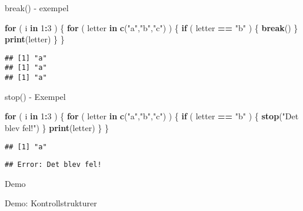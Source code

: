 \documentclass[
  11pt,
  ignorenonframetext,
]{beamer}
\newenvironment{Shaded}{\begin{snugshade}}{\end{snugshade}}
\newcommand{\ControlFlowTok}[1]{\textcolor[rgb]{0.13,0.29,0.53}{\textbf{#1}}}
\newcommand{\DecValTok}[1]{\textcolor[rgb]{0.00,0.00,0.81}{#1}}
\newcommand{\FunctionTok}[1]{\textcolor[rgb]{0.13,0.29,0.53}{\textbf{#1}}}
\newcommand{\NormalTok}[1]{#1}
\newcommand{\SpecialCharTok}[1]{\textcolor[rgb]{0.81,0.36,0.00}{\textbf{#1}}}
\newcommand{\StringTok}[1]{\textcolor[rgb]{0.31,0.60,0.02}{#1}}
\begin{document}
\begin{frame}[fragile]{break() - exempel}
\label{break---exempel}
\begin{Shaded}
\begin{Highlighting}[]
\ControlFlowTok{for}\NormalTok{ ( i }\ControlFlowTok{in} \DecValTok{1}\SpecialCharTok{:}\DecValTok{3}\NormalTok{ ) \{}
  \ControlFlowTok{for}\NormalTok{ ( letter }\ControlFlowTok{in} \FunctionTok{c}\NormalTok{(}\StringTok{"a"}\NormalTok{,}\StringTok{"b"}\NormalTok{,}\StringTok{"c"}\NormalTok{) ) \{}
    \ControlFlowTok{if}\NormalTok{ ( letter }\SpecialCharTok{==} \StringTok{"b"}\NormalTok{ ) \{ }\ControlFlowTok{break}\NormalTok{() \}}
    \FunctionTok{print}\NormalTok{(letter)}
\NormalTok{  \}}
\NormalTok{\}}
\end{Highlighting}
\end{Shaded}

\pause

\begin{verbatim}
## [1] "a"
## [1] "a"
## [1] "a"
\end{verbatim}
\end{frame}

\begin{frame}[fragile]{stop() - Exempel}
\label{stop---exempel}
\begin{Shaded}
\begin{Highlighting}[]
\ControlFlowTok{for}\NormalTok{ ( i }\ControlFlowTok{in} \DecValTok{1}\SpecialCharTok{:}\DecValTok{3}\NormalTok{ ) \{}
  \ControlFlowTok{for}\NormalTok{ ( letter }\ControlFlowTok{in} \FunctionTok{c}\NormalTok{(}\StringTok{"a"}\NormalTok{,}\StringTok{"b"}\NormalTok{,}\StringTok{"c"}\NormalTok{) ) \{}
    \ControlFlowTok{if}\NormalTok{ ( letter }\SpecialCharTok{==} \StringTok{"b"}\NormalTok{ ) \{ }\FunctionTok{stop}\NormalTok{(}\StringTok{"Det blev fel!"}\NormalTok{) \}}
    \FunctionTok{print}\NormalTok{(letter)}
\NormalTok{  \}}
\NormalTok{\}}
\end{Highlighting}
\end{Shaded}

\pause

\begin{verbatim}
## [1] "a"
\end{verbatim}

\begin{verbatim}
## Error: Det blev fel!
\end{verbatim}
\end{frame}

\begin{frame}{Demo}
\label{demo-4}
\begin{block}{Demo: Kontrollstrukturer}
\label{demo-kontrollstrukturer}
\end{block}
\end{frame}
\end{document}
